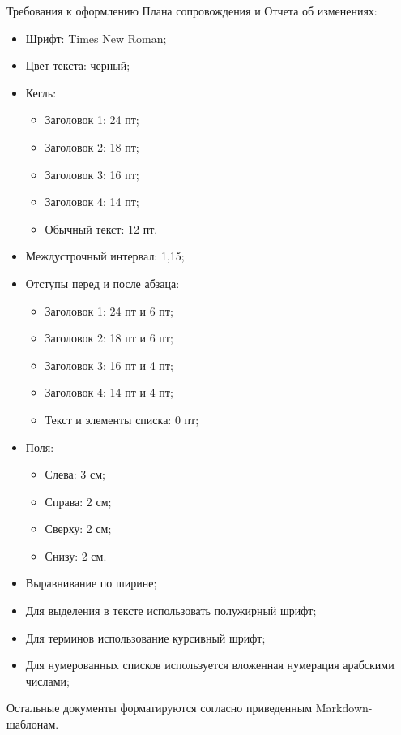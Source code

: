 Требования к оформлению Плана сопровождения и Отчета об изменениях:
\begin{itemize}
    \item Шрифт: Times New Roman;
    \item Цвет текста: черный;
    \item Кегль:
    \begin{itemize}
        \item Заголовок 1: 24 пт;
        \item Заголовок 2: 18 пт;
        \item Заголовок 3: 16 пт;
        \item Заголовок 4: 14 пт;
        \item Обычный текст: 12 пт.
    \end{itemize}
    \item Междустрочный интервал: 1,15;
    \item Отступы перед и после абзаца:
    \begin{itemize}
        \item Заголовок 1: 24 пт и 6 пт;
        \item Заголовок 2: 18 пт и 6 пт;
        \item Заголовок 3: 16 пт и 4 пт;
        \item Заголовок 4: 14 пт и 4 пт;
        \item Текст и элементы списка: 0 пт;
    \end{itemize}
    \item Поля:
    \begin{itemize}
        \item Слева: 3 см;
        \item Справа: 2 см;
        \item Сверху: 2 см;
        \item Снизу: 2 см.
    \end{itemize}
    \item Выравнивание по ширине;
    \item Для выделения в тексте использовать полужирный шрифт;
    \item Для терминов использование курсивный шрифт;
    \item Для нумерованных списков используется вложенная нумерация арабскими числами;
\end{itemize}

Остальные документы форматируются согласно приведенным Markdown-шаблонам.

